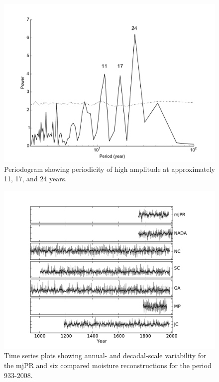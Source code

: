 \begin{figure}
\centering
\includegraphics[width=5in]{figures/spectralRecon.pdf}
\caption{Periodogram showing periodicity of high amplitude at approximately 11, 17, and 24 years.}
\label{fig:spectral}
\end{figure}

\begin{figure}
\centering
\includegraphics[width=5in]{figures/reconsStacked.pdf}
\caption{Time series plots showing annual- and decadal-scale variability for the mjPR and six compared moisture reconstructions for the period 933-2008.}
\label{fig:allRecons}
\end{figure}

